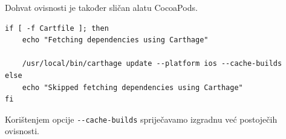 \documentclass[times, utf8, diplomski, numeric]{fer}
\begin{document}
\begin{appendices}
Dohvat ovisnosti je također sličan alatu CocoaPods.

\begin{verbatim}
if [ -f Cartfile ]; then
    echo "Fetching dependencies using Carthage"

    /usr/local/bin/carthage update --platform ios --cache-builds
else
    echo "Skipped fetching dependencies using Carthage"
fi
\end{verbatim}

Korištenjem opcije \verb|--cache-builds| spriječavamo izgradnu već postoječih ovisnosti.
















\end{appendices}
\end{document}
